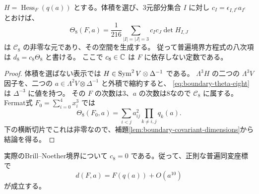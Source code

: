 \begin{lemma}[唯一の八次候補]\label{lem:boundary-eighth-covariant}
$H=\operatorname{Hess}_F(q(a))$ とする。体積を選び、3元部分集合 $I$ に対し
$c_I=\epsilon_{I,I^c}a_{I^c}$ とおけば、
\begin{equation}\label{eq:boundary-theta-eight}
 \Theta_8(F,a)=\frac1{216}
       \sum_{|I|=|J|=3}c_Ic_J\det H_{I,J}
\end{equation}
は $\mathcal C_8$ の非零な元であり、その空間を生成する。
従って普遍境界方程式の八次項は $d_8=c_8\Theta_8$ と書ける。
ここで $c_8\in\mathbb C$ は $F$ に依存しない定数である。
\end{lemma}

\begin{proof}
体積を選ばない表示では
$H\in\operatorname{Sym}^2V\otimes\Delta^{-1}$ である。
$\Lambda^3H$ の二つの $\Lambda^3V$ 因子を、二つの
$a\in\Lambda^2V\otimes\Delta^{-1}$ と外積で縮約すると、
\eqref{eq:boundary-theta-eight}は $\Delta^{-3}$ に値を持つ。
その $F$ の次数は3、$a$ の次数は8なので $\mathcal C_8$ に属する。
Fermat式 $F_0=\sum_{i=0}^4x_i^3$ では
\begin{equation}\label{eq:boundary-theta-fermat}
 \Theta_8(F_0,a)=
       \sum_{i<j}a_{ij}^2\prod_{k\ne i,j}q_k(a).
\end{equation}
下の横断切片でこれは非零なので、補題\ref{lem:boundary-covariant-dimensions}から結論を得る。
\end{proof}

\begin{theorem}[実際の八次項の幾何的消滅]\label{thm:boundary-eighth-vanishing}
実際のBrill--Noether境界について $c_8=0$ である。従って、正則な普遍同変座標で
\begin{equation}\label{eq:boundary-nine-jet}
                         d(F,a)=F(q(a))+O(a^{10})
\end{equation}
が成立する。
\end{theorem}

